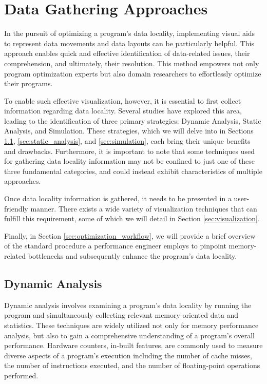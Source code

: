 \section{Data Gathering Approaches}\label{sec:methods}
In the pursuit of optimizing a program's data locality, implementing visual aids to represent data movements and data layouts can be particularly helpful. This approach enables quick and effective identification of data-related issues, their comprehension, and ultimately, their resolution. This method empowers not only program optimization experts but also domain researchers to effortlessly optimize their programs.

To enable such effective visualization, however, it is essential to first collect information regarding data locality. Several studies have explored this area, leading to the identification of three primary strategies: Dynamic Analysis, Static Analysis, and Simulation. These strategies, which we will delve into in Sections \ref{sec:dynamic_analysis}, \ref{sec:static_analysis}, and \ref{sec:simulation}, each bring their unique benefits and drawbacks. Furthermore, it is important to note that some techniques used for gathering data locality information may not be confined to just one of these three fundamental categories, and could instead exhibit characteristics of multiple approaches.

Once data locality information is gathered, it needs to be presented in a user-friendly manner. There exists a wide variety of visualization techniques that can fulfill this requirement, some of which we will detail in Section \ref{sec:visualization}.

Finally, in Section \ref{sec:optimization_workflow}, we will provide a brief overview of the standard procedure a performance engineer employs to pinpoint memory-related bottlenecks and subsequently enhance the program's data locality.

\subsection{Dynamic Analysis}\label{sec:dynamic_analysis}
Dynamic analysis involves examining a program's data locality by running the program and simultaneously collecting relevant memory-oriented data and statistics. These techniques are widely utilized not only for memory performance analysis, but also to gain a comprehensive understanding of a program's overall performance. Hardware counters, in-built features, are commonly used to measure diverse aspects of a program's execution including the number of cache misses, the number of instructions executed, and the number of floating-point operations performed.

